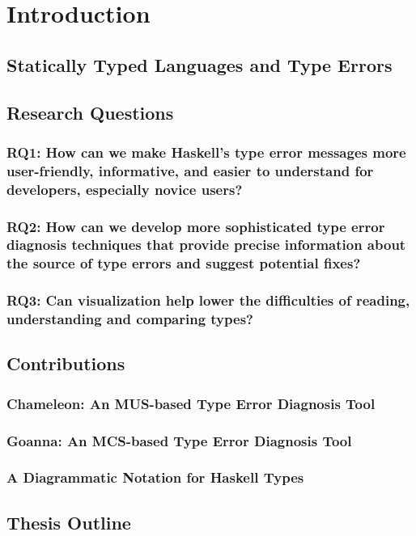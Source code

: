 
\chapter{Introduction}
\label{chapter1} 

\section{Statically Typed Languages and Type Errors}


\section{Research Questions} \label{sec:research-questions}


\subsection{RQ1: How can we make Haskell's type error messages more user-friendly, informative, and easier to understand for developers, especially novice users?}

\subsection{RQ2: How can we develop more sophisticated type error diagnosis techniques that provide precise information about the source of type errors and suggest potential fixes?}


\subsection{RQ3: Can visualization help lower the difficulties of reading, understanding and comparing types?}

\section{Contributions}  \label{sec:contributions}

\subsection{Chameleon: An MUS-based Type Error Diagnosis Tool}


\subsection{Goanna: An MCS-based Type Error Diagnosis Tool}


\subsection{A Diagrammatic Notation for Haskell Types}


\section{Thesis Outline}